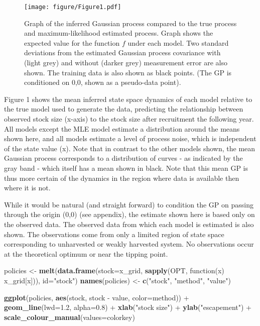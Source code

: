 \documentclass[author-year, review]{elsarticle} %
\makeatletter
\newenvironment{Shaded}{}{}
\newcommand{\KeywordTok}[1]{\textcolor[rgb]{0.00,0.44,0.13}{\textbf{{#1}}}}
\newcommand{\DataTypeTok}[1]{\textcolor[rgb]{0.56,0.13,0.00}{{#1}}}
\newcommand{\FloatTok}[1]{\textcolor[rgb]{0.25,0.63,0.44}{{#1}}}
\newcommand{\StringTok}[1]{\textcolor[rgb]{0.25,0.44,0.63}{{#1}}}
\newcommand{\NormalTok}[1]{{#1}}
\def\maxwidth{\ifdim\Gin@nat@width>\linewidth\linewidth
\else\Gin@nat@width\fi}
\let\Oldincludegraphics\includegraphics
\renewcommand{\includegraphics}[1]{\Oldincludegraphics[width=\maxwidth]{#1}}
\makeatother
\begin{document}
\begin{figure}[htbp]
\centering
\texttt{[image: figure/Figure1.pdf]}
\caption{Graph of the inferred Gaussian process compared to the true
process and maximum-likelihood estimated process. Graph shows the
expected value for the function $f$ under each model. Two standard
deviations from the estimated Gaussian process covariance with (light
grey) and without (darker grey) measurement error are also shown. The
training data is also shown as black points. (The GP is conditioned on
0,0, shown as a pseudo-data point).}
\end{figure}

Figure 1 shows the mean inferred state space dynamics of each model
relative to the true model used to generate the data, predicting the
relationship between observed stock size (x-axis) to the stock size
after recruitment the following year. All models except the MLE model
estimate a distribution around the means shown here, and all models
estimate a level of process noise, which is independent of the state
value (x). Note that in contrast to the other models shown, the mean
Gaussian process corresponds to a distribution of curves - as indicated
by the gray band - which itself has a mean shown in black. Note that
this mean GP is thus more certain of the dynamics in the region where
data is available then where it is not.

While it would be natural (and straight forward) to condition the GP on
passing through the origin (0,0) (see appendix), the estimate shown here
is based only on the observed data. The observed data from which each
model is estimated is also shown. The observations come from only a
limited region of state space corresponding to unharvested or weakly
harvested system. No observations occur at the theoretical optimum or
near the tipping point.

\begin{Shaded}
\begin{Highlighting}[]
\NormalTok{policies <- }\KeywordTok{melt}\NormalTok{(}\KeywordTok{data.frame}\NormalTok{(}\DataTypeTok{stock=}\NormalTok{x_grid, }\KeywordTok{sapply}\NormalTok{(OPT, function(x) x_grid[x])), }\DataTypeTok{id=}\StringTok{"stock"}\NormalTok{)}
\KeywordTok{names}\NormalTok{(policies) <- }\KeywordTok{c}\NormalTok{(}\StringTok{"stock"}\NormalTok{, }\StringTok{"method"}\NormalTok{, }\StringTok{"value"}\NormalTok{)}

\KeywordTok{ggplot}\NormalTok{(policies, }\KeywordTok{aes}\NormalTok{(stock, stock - value, }\DataTypeTok{color=}\NormalTok{method)) +}
  \KeywordTok{geom_line}\NormalTok{(}\DataTypeTok{lwd=}\FloatTok{1.2}\NormalTok{, }\DataTypeTok{alpha=}\FloatTok{0.8}\NormalTok{) + }\KeywordTok{xlab}\NormalTok{(}\StringTok{"stock size"}\NormalTok{) + }\KeywordTok{ylab}\NormalTok{(}\StringTok{"escapement"}\NormalTok{)  +}
  \KeywordTok{scale_colour_manual}\NormalTok{(}\DataTypeTok{values=}\NormalTok{colorkey)}
\end{Highlighting}
\end{Shaded}
\end{document}
